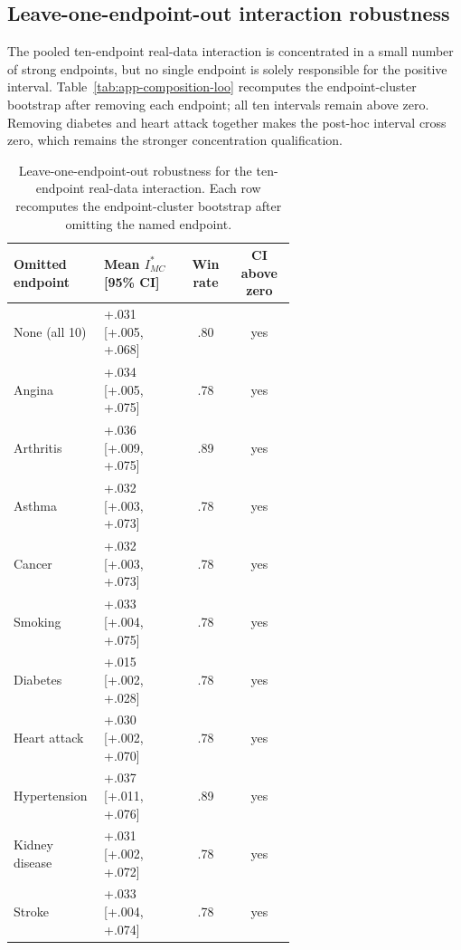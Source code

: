 
\subsection{Leave-one-endpoint-out interaction robustness}

The pooled ten-endpoint real-data interaction is concentrated in a small
number of strong endpoints, but no single endpoint is solely responsible for
the positive interval.  Table~\ref{tab:app-composition-loo} recomputes the
endpoint-cluster bootstrap after removing each endpoint; all ten intervals
remain above zero.  Removing diabetes and heart attack together makes the
post-hoc interval cross zero, which remains the stronger concentration
qualification.

\begin{table}[H]
\caption{Leave-one-endpoint-out robustness for the ten-endpoint real-data interaction. Each row recomputes the endpoint-cluster bootstrap after omitting the named endpoint.}
\label{tab:app-composition-loo}
\label{tab:app_loo}
\centering\scriptsize
\setlength{\tabcolsep}{6pt}
\begin{tabular}{P{0.32\linewidth}P{0.30\linewidth}cc}
\toprule Omitted endpoint & Mean $I^*_{MC}$ [95\% CI] & Win rate & CI above zero \\
\midrule
None (all 10) & +.031 [+.005, +.068] & .80 & yes \\
Angina & +.034 [+.005, +.075] & .78 & yes \\
Arthritis & +.036 [+.009, +.075] & .89 & yes \\
Asthma & +.032 [+.003, +.073] & .78 & yes \\
Cancer & +.032 [+.003, +.073] & .78 & yes \\
Smoking & +.033 [+.004, +.075] & .78 & yes \\
Diabetes & +.015 [+.002, +.028] & .78 & yes \\
Heart attack & +.030 [+.002, +.070] & .78 & yes \\
Hypertension & +.037 [+.011, +.076] & .89 & yes \\
Kidney disease & +.031 [+.002, +.072] & .78 & yes \\
Stroke & +.033 [+.004, +.074] & .78 & yes \\
\bottomrule\end{tabular}
\end{table}

